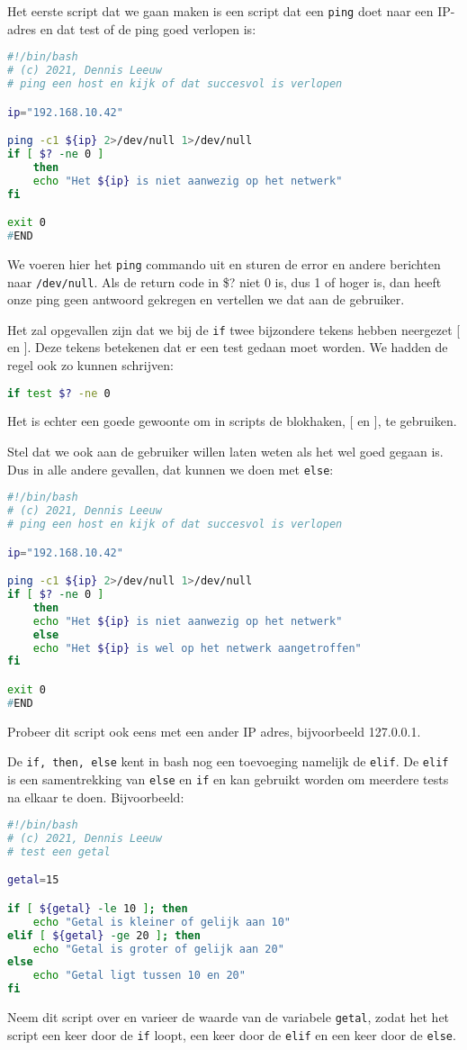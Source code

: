 Het eerste script dat we gaan maken is een script dat een \texttt{ping} doet naar een IP-adres en dat test of de ping goed verlopen is:
\begin{lstlisting}[language=bash]
#!/bin/bash
# (c) 2021, Dennis Leeuw
# ping een host en kijk of dat succesvol is verlopen

ip="192.168.10.42"

ping -c1 ${ip} 2>/dev/null 1>/dev/null
if [ $? -ne 0 ]
	then
	echo "Het ${ip} is niet aanwezig op het netwerk"
fi

exit 0
#END
\end{lstlisting}
We voeren hier het \texttt{ping} commando uit en sturen de error en andere berichten naar \texttt{/dev/null}. Als de return code in \$? niet 0 is, dus 1 of hoger is, dan heeft onze ping geen antwoord gekregen en vertellen we dat aan de gebruiker.

Het zal opgevallen zijn dat we bij de \texttt{if} twee bijzondere tekens hebben neergezet [ en ]. Deze tekens betekenen dat er een test gedaan moet worden. We hadden de regel ook zo kunnen schrijven:
\begin{lstlisting}[language=bash]
if test $? -ne 0
\end{lstlisting}
Het is echter een goede gewoonte om in scripts de blokhaken, [ en ], te gebruiken.

Stel dat we ook aan de gebruiker willen laten weten als het wel goed gegaan is. Dus in alle andere gevallen, dat kunnen we doen met \texttt{else}:
\begin{lstlisting}[language=bash]
#!/bin/bash
# (c) 2021, Dennis Leeuw
# ping een host en kijk of dat succesvol is verlopen

ip="192.168.10.42"

ping -c1 ${ip} 2>/dev/null 1>/dev/null
if [ $? -ne 0 ]
	then
	echo "Het ${ip} is niet aanwezig op het netwerk"
	else
	echo "Het ${ip} is wel op het netwerk aangetroffen"
fi

exit 0
#END
\end{lstlisting}
Probeer dit script ook eens met een ander IP adres, bijvoorbeeld 127.0.0.1.

De \texttt{if, then, else} kent in bash nog een toevoeging namelijk de \texttt{elif}. De \texttt{elif} is een samentrekking van \texttt{else} en \texttt{if} en kan gebruikt worden om meerdere tests na elkaar te doen. Bijvoorbeeld:
\begin{lstlisting}[language=bash]
#!/bin/bash
# (c) 2021, Dennis Leeuw
# test een getal

getal=15

if [ ${getal} -le 10 ]; then
	echo "Getal is kleiner of gelijk aan 10"
elif [ ${getal} -ge 20 ]; then
	echo "Getal is groter of gelijk aan 20"
else
	echo "Getal ligt tussen 10 en 20"
fi
\end{lstlisting}
Neem dit script over en varieer de waarde van de variabele \texttt{getal}, zodat het het script een keer door de \texttt{if} loopt, een keer door de \texttt{elif} en een keer door de \texttt{else}.
